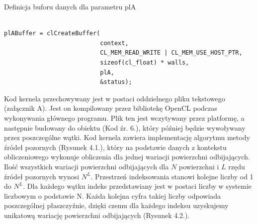 \begin{program}
\caption{Definicja buforu danych dla parametru plA}
\begin{lstlisting}

plABuffer = clCreateBuffer(
                           context, 
                           CL_MEM_READ_WRITE | CL_MEM_USE_HOST_PTR,
                           sizeof(cl_float) * walls,
                           plA, 
                           &status);
\end{lstlisting}
\end{program}
Kod kernela przechowywany jest w postaci oddzielnego pliku tekstowego (załącznik A). Jest on kompilowany przez bibliotekę OpenCL podczas wykonywania głównego programu. Plik ten jest wczytywany przez platformę, a następnie budowany do obiektu (Kod źr. 6.), który później będzie wywoływany przez poszczególne wątki. Kod kernela zawiera implementację algorytmu metody źródeł pozornych (Rysunek 4.1.), który na podstawie danych z kontekstu obliczeniowego wykonuje obliczenia dla jednej wariacji powierzchni odbijających. Ilość wszystkich wariacji powierzchni odbijających dla $N$ powierzchni i $L$ rzędu źródeł pozornych wynosi $N^L$. Przestrzeń indeksowania stanowi kolejne liczby od 1 do $N^L$. Dla każdego wątku indeks przedstawiany jest w postaci liczby w systemie liczbowym o podstawie N. Każda kolejna cyfra takiej liczby odpowiada poszczególnej płaszczyźnie, dzięki czemu dla każdego indeksu uzyskujemy unikatową wariację powierzchni odbijających (Rysunek 4.2.).

